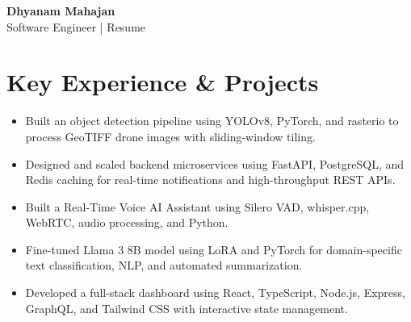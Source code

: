 \documentclass[11pt,a4paper]{article}
\newcommand{\resumeItem}[1]{
  \item\small{#1 \vspace{-2pt}}
}
\begin{document}
\begin{center}
    \textbf{\Huge Dhyanam Mahajan} \\ \vspace{5pt}
    Software Engineer | Resume
\end{center}

\section*{Key Experience \& Projects}
\begin{itemize}
\resumeItem{Built an object detection pipeline using YOLOv8, PyTorch, and rasterio to process GeoTIFF drone images with sliding-window tiling.}

\resumeItem{Designed and scaled backend microservices using FastAPI, PostgreSQL, and Redis caching for real-time notifications and high-throughput REST APIs.}

\resumeItem{Built a Real-Time Voice AI Assistant using Silero VAD, whisper.cpp, WebRTC, audio processing, and Python.}

\resumeItem{Fine-tuned Llama 3 8B model using LoRA and PyTorch for domain-specific text classification, NLP, and automated summarization.}

\resumeItem{Developed a full-stack dashboard using React, TypeScript, Node.js, Express, GraphQL, and Tailwind CSS with interactive state management.}
\end{itemize}
\end{document}
